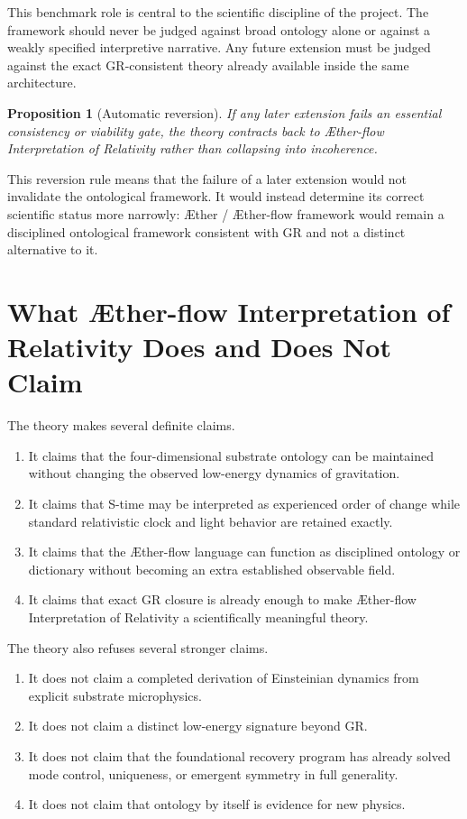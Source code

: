\documentclass[11pt]{article}
\newcommand{\Aether}{\AE{}ther}
\newcommand{\Aflow}{\AE{}ther-flow}
\newcommand{\TheoryName}{\Aflow{} Interpretation of Relativity}
\newcommand{\TheoryProgram}{\Aether{} / \Aflow{} framework}
\newtheorem{proposition}{Proposition}
\begin{document}
This benchmark role is central to the scientific discipline of the project. The framework should never be judged against broad ontology alone or against a weakly specified interpretive narrative. Any future extension must be judged against the exact GR-consistent theory already available inside the same architecture.

\begin{proposition}[Automatic reversion]
If any later extension fails an essential consistency or viability gate, the theory contracts back to \TheoryName{} rather than collapsing into incoherence.
\end{proposition}

This reversion rule means that the failure of a later extension would not invalidate the ontological framework. It would instead determine its correct scientific status more narrowly: \TheoryProgram{} would remain a disciplined ontological framework consistent with GR and not a distinct alternative to it.

\section{What \TheoryName{} Does and Does Not Claim}

The theory makes several definite claims.
\begin{enumerate}
    \item It claims that the four-dimensional substrate ontology can be maintained without changing the observed low-energy dynamics of gravitation.
    \item It claims that S-time may be interpreted as experienced order of change while standard relativistic clock and light behavior are retained exactly.
    \item It claims that the \Aflow{} language can function as disciplined ontology or dictionary without becoming an extra established observable field.
    \item It claims that exact GR closure is already enough to make \TheoryName{} a scientifically meaningful theory.
\end{enumerate}

The theory also refuses several stronger claims.
\begin{enumerate}
    \item It does not claim a completed derivation of Einsteinian dynamics from explicit substrate microphysics.
    \item It does not claim a distinct low-energy signature beyond GR.
    \item It does not claim that the foundational recovery program has already solved mode control, uniqueness, or emergent symmetry in full generality.
    \item It does not claim that ontology by itself is evidence for new physics.
\end{enumerate}
\end{document}
